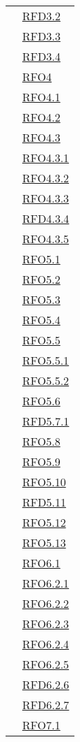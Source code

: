 \begin{longtable}{|>{\centering}m{5cm}|m{5cm}<{\centering}|}
& \hyperlink{RFD3.2}{RFD3.2}\\
& \hyperlink{RFD3.3}{RFD3.3}\\
& \hyperlink{RFD3.4}{RFD3.4}\\
& \hyperlink{RFO4}{RFO4}\\
& \hyperlink{RFO4.1}{RFO4.1}\\
& \hyperlink{RFO4.2}{RFO4.2}\\
& \hyperlink{RFO4.3}{RFO4.3}\\
& \hyperlink{RFO4.3.1}{RFO4.3.1}\\
& \hyperlink{RFO4.3.2}{RFO4.3.2}\\
& \hyperlink{RFO4.3.3}{RFO4.3.3}\\
& \hyperlink{RFD4.3.4}{RFD4.3.4}\\
& \hyperlink{RFO4.3.5}{RFO4.3.5}\\
& \hyperlink{RFO5.1}{RFO5.1}\\
& \hyperlink{RFO5.2}{RFO5.2}\\
& \hyperlink{RFO5.3}{RFO5.3}\\
& \hyperlink{RFO5.4}{RFO5.4}\\
& \hyperlink{RFO5.5}{RFO5.5}\\
& \hyperlink{RFO5.5.1}{RFO5.5.1}\\
& \hyperlink{RFO5.5.2}{RFO5.5.2}\\
& \hyperlink{RFO5.6}{RFO5.6}\\
& \hyperlink{RFD5.7.1}{RFD5.7.1}\\
& \hyperlink{RFO5.8}{RFO5.8}\\
& \hyperlink{RFO5.9}{RFO5.9}\\
& \hyperlink{RFO5.10}{RFO5.10}\\
& \hyperlink{RFD5.11}{RFD5.11}\\
& \hyperlink{RFO5.12}{RFO5.12}\\
& \hyperlink{RFO5.13}{RFO5.13}\\
& \hyperlink{RFO6.1}{RFO6.1}\\
& \hyperlink{RFO6.2.1}{RFO6.2.1}\\
& \hyperlink{RFO6.2.2}{RFO6.2.2}\\
& \hyperlink{RFO6.2.3}{RFO6.2.3}\\
& \hyperlink{RFO6.2.4}{RFO6.2.4}\\
& \hyperlink{RFO6.2.5}{RFO6.2.5}\\
& \hyperlink{RFD6.2.6}{RFD6.2.6}\\
& \hyperlink{RFD6.2.7}{RFD6.2.7}\\
& \hyperlink{RFO7.1}{RFO7.1}\\

\end{longtable}
